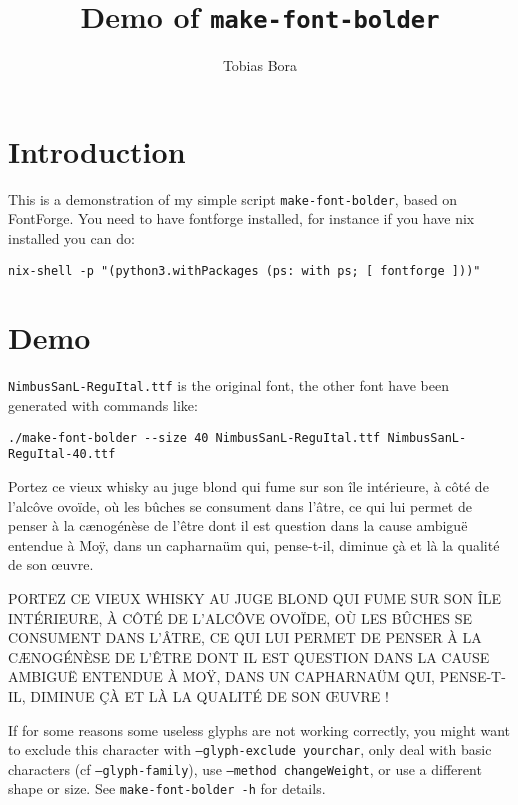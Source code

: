 \documentclass[11pt]{article}
\date{}
\title{Demo of \texttt{make-font-bolder}}
\author{Tobias Bora}
\begin{document}
\maketitle

\section{Introduction}

This is a demonstration of my simple script \texttt{make-font-bolder}, based on FontForge. You need to have fontforge installed, for instance if you have nix installed you can do:

\begin{verbatim}
nix-shell -p "(python3.withPackages (ps: with ps; [ fontforge ]))"
\end{verbatim}

\section{Demo}

\texttt{NimbusSanL-ReguItal.ttf} is the original font, the other font have been generated with commands like:
\begin{verbatim}
./make-font-bolder --size 40 NimbusSanL-ReguItal.ttf NimbusSanL-ReguItal-40.ttf
\end{verbatim}









\medskip

{ Portez ce vieux whisky au juge blond qui fume sur son île intérieure, à côté de l'alcôve ovoïde, où les bûches se consument dans l'âtre, ce qui lui permet de penser à la cænogénèse de l'être dont il est question dans la cause ambiguë entendue à Moÿ, dans un capharnaüm qui, pense-t-il, diminue çà et là la qualité de son œuvre.

  \medskip

  PORTEZ CE VIEUX WHISKY AU JUGE BLOND QUI FUME SUR SON ÎLE INTÉRIEURE, À CÔTÉ DE L'ALCÔVE OVOÏDE, OÙ LES BÛCHES SE CONSUMENT DANS L'ÂTRE, CE QUI LUI PERMET DE PENSER À LA CÆNOGÉNÈSE DE L'ÊTRE DONT IL EST QUESTION DANS LA CAUSE AMBIGUË ENTENDUE À MOŸ, DANS UN CAPHARNAÜM QUI, PENSE-T-IL, DIMINUE ÇÀ ET LÀ LA QUALITÉ DE SON ŒUVRE !
}

\medskip

If for some reasons some useless glyphs are not working correctly, you might want to exclude this character with \texttt{--glyph-exclude yourchar}, only deal with basic characters (cf \texttt{--glyph-family}), use \texttt{--method changeWeight}, or use a different shape or size. See \texttt{make-font-bolder -h} for details.
\end{document}

